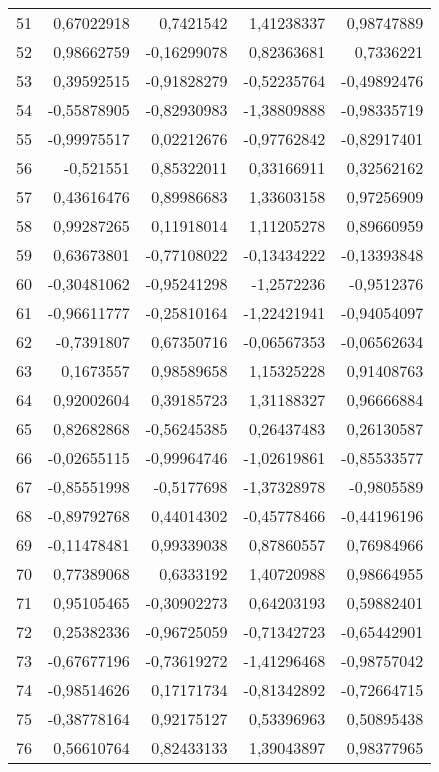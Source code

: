 \documentclass[12pt]{article}
\begin{document}
\begin{longtable}{lrrrr}
 51 & 0,67022918 &  0,7421542 & 1,41238337 & 0,98747889 \\
 52 & 0,98662759 & -0,16299078 & 0,82363681 &  0,7336221 \\
 53 & 0,39592515 & -0,91828279 & -0,52235764 & -0,49892476 \\
 54 & -0,55878905 & -0,82930983 & -1,38809888 & -0,98335719 \\
 55 & -0,99975517 & 0,02212676 & -0,97762842 & -0,82917401 \\
 56 &  -0,521551 & 0,85322011 & 0,33166911 & 0,32562162 \\
 57 & 0,43616476 & 0,89986683 & 1,33603158 & 0,97256909 \\
 58 & 0,99287265 & 0,11918014 & 1,11205278 & 0,89660959 \\
 59 & 0,63673801 & -0,77108022 & -0,13434222 & -0,13393848 \\
 60 & -0,30481062 & -0,95241298 & -1,2572236 & -0,9512376 \\
 61 & -0,96611777 & -0,25810164 & -1,22421941 & -0,94054097 \\
 62 & -0,7391807 & 0,67350716 & -0,06567353 & -0,06562634 \\
 63 &  0,1673557 & 0,98589658 & 1,15325228 & 0,91408763 \\
 64 & 0,92002604 & 0,39185723 & 1,31188327 & 0,96666884 \\
 65 & 0,82682868 & -0,56245385 & 0,26437483 & 0,26130587 \\
 66 & -0,02655115 & -0,99964746 & -1,02619861 & -0,85533577 \\
 67 & -0,85551998 & -0,5177698 & -1,37328978 & -0,9805589 \\
 68 & -0,89792768 & 0,44014302 & -0,45778466 & -0,44196196 \\
 69 & -0,11478481 & 0,99339038 & 0,87860557 & 0,76984966 \\
 70 & 0,77389068 &  0,6333192 & 1,40720988 & 0,98664955 \\
 71 & 0,95105465 & -0,30902273 & 0,64203193 & 0,59882401 \\
 72 & 0,25382336 & -0,96725059 & -0,71342723 & -0,65442901 \\
 73 & -0,67677196 & -0,73619272 & -1,41296468 & -0,98757042 \\
 74 & -0,98514626 & 0,17171734 & -0,81342892 & -0,72664715 \\
 75 & -0,38778164 & 0,92175127 & 0,53396963 & 0,50895438 \\
 76 & 0,56610764 & 0,82433133 & 1,39043897 & 0,98377965 \\

\end{longtable}
\end{document}
